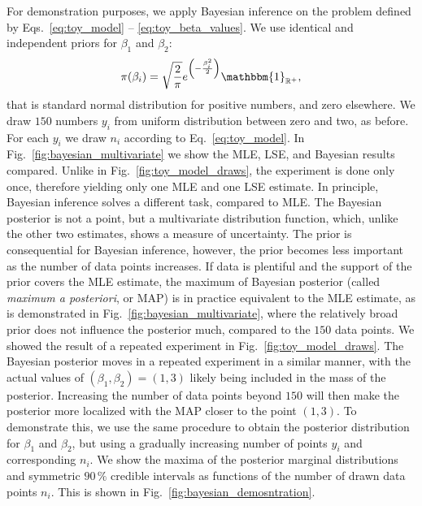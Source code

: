 For demonstration purposes, we apply Bayesian inference on the problem defined by Eqs.~\ref{eq:toy_model} -- \ref{eq:toy_beta_values}. We use identical and independent priors for $\beta_1$ and $\beta_2$:
\begin{equation}
    \pi(\beta_i) = \sqrt{\frac{2}{\pi}} e^{\left(-\frac{\beta_i^2}{2}\right)} \mathbbm{1}_{\mathbb{R}^+} ,
\end{equation}
that is standard normal distribution for positive numbers, and zero elsewhere. We draw $150$ numbers $y_i$ from uniform distribution between zero and two, as before. For each $y_i$ we draw $n_i$ according to Eq.~\ref{eq:toy_model}. In Fig.~\ref{fig:bayesian_multivariate} we show the MLE, LSE, and Bayesian results compared. Unlike in Fig.~\ref{fig:toy_model_draws}, the experiment is done only once, therefore yielding only one MLE and one LSE estimate. In principle, Bayesian inference solves a different task, compared to MLE. The Bayesian posterior is not a point, but a multivariate distribution function, which, unlike the other two estimates, shows a measure of uncertainty. The prior is consequential for Bayesian inference, however, the prior becomes less important as the number of data points increases. If data is plentiful and the support of the prior covers the MLE estimate, the maximum of Bayesian posterior (called \textit{maximum a posteriori}, or MAP) is in practice equivalent to the MLE estimate, as is demonstrated in Fig.~\ref{fig:bayesian_multivariate}, where the relatively broad prior does not influence the posterior much, compared to the $150$ data points. We showed the result of a repeated experiment in Fig.~\ref{fig:toy_model_draws}. The Bayesian posterior moves in a repeated experiment in a similar manner, with the actual values of $(\beta_1,\beta_2) = (1,3)$ likely being included in the mass of the posterior. Increasing the number of data points beyond $150$ will then make the posterior more localized with the MAP closer to the point $(1,3)$. To demonstrate this, we use the same procedure to obtain the posterior distribution for $\beta_1$ and $\beta_2$, but using a gradually increasing number of points $y_i$ and corresponding $n_i$. We show the maxima of the posterior marginal distributions and symmetric $90 \, \%$ credible intervals as functions of the number of drawn data points $n_i$. This is shown in Fig.~\ref{fig:bayesian_demosntration}.

